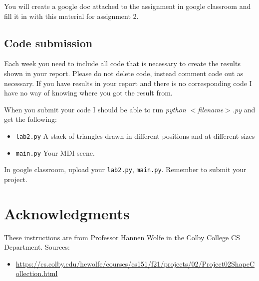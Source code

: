 \documentclass[12pt]{article}
\begin{document}
You will create a google doc attached to the assignment in google classroom and fill it in with this material for assignment 2. 

\subsection{Code submission}
Each week you need to include all code that is necessary to create the results shown in your report.
Please do not delete code, instead comment code out as necessary.
If you have results in your report and there is no corresponding code I have no way of knowing where you got the result from.

When you submit your code I should be able to run \textit{python $<$filename$>$.py} and get the following:
\begin{itemize}
\item \texttt{lab2.py} A stack of triangles drawn in different positions and at different sizes
  \item \texttt{main.py} Your MDI scene. 
\end{itemize}

In google classroom, upload your \texttt{lab2.py}, \texttt{main.py}. 
Remember to submit your project.

\section{Acknowledgments}
These instructions are from Professor Hannen Wolfe in the Colby College CS Department. 
Sources:
\begin{itemize}
\item \footnotesize{\url{https://cs.colby.edu/hewolfe/courses/cs151/f21/projects/02/Project02ShapeCollection.html}}
\end{itemize}
\end{document}

